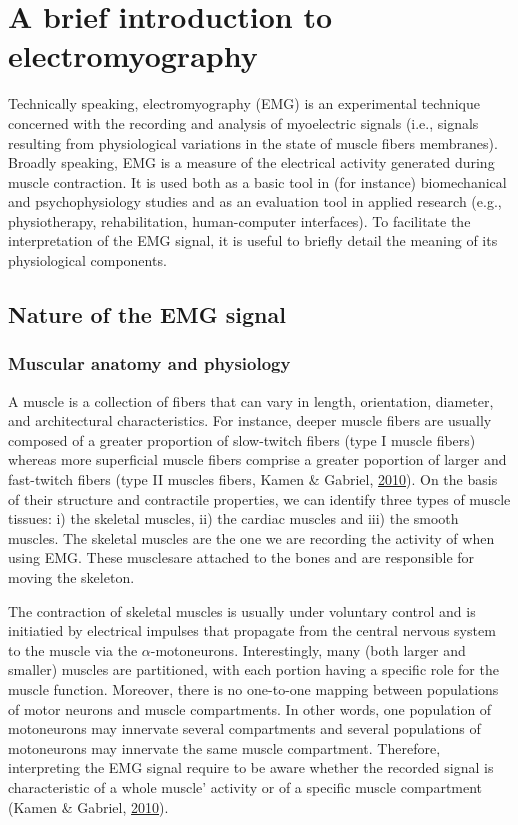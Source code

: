 \documentclass[a4paper,12pt,twoside,openright,oldfontcommands]{memoir}
\begin{document}
\section{A brief introduction to
electromyography}\label{a-brief-introduction-to-electromyography}

Technically speaking, electromyography (EMG) is an experimental
technique concerned with the recording and analysis of myoelectric
signals (i.e., signals resulting from physiological variations in the
state of muscle fibers membranes). Broadly speaking, EMG is a measure of
the electrical activity generated during muscle contraction. It is used
both as a basic tool in (for instance) biomechanical and
psychophysiology studies and as an evaluation tool in applied research
(e.g., physiotherapy, rehabilitation, human-computer interfaces). To
facilitate the interpretation of the EMG signal, it is useful to briefly
detail the meaning of its physiological components.

\subsection{Nature of the EMG signal}\label{nature-of-the-emg-signal}

\subsubsection{Muscular anatomy and
physiology}\label{muscular-anatomy-and-physiology}

A muscle is a collection of fibers that can vary in length, orientation,
diameter, and architectural characteristics. For instance, deeper muscle
fibers are usually composed of a greater proportion of slow-twitch
fibers (type I muscle fibers) whereas more superficial muscle fibers
comprise a greater poportion of larger and fast-twitch fibers (type II
muscles fibers, Kamen \& Gabriel,
\protect\hyperlink{ref-kamen_essentials_2010}{2010}). On the basis of
their structure and contractile properties, we can identify three types
of muscle tissues: i) the skeletal muscles, ii) the cardiac muscles and
iii) the smooth muscles. The skeletal muscles are the one we are
recording the activity of when using EMG. These musclesare attached to
the bones and are responsible for moving the skeleton.

The contraction of skeletal muscles is usually under voluntary control
and is initiatied by electrical impulses that propagate from the central
nervous system to the muscle via the \(\alpha\)-motoneurons.
Interestingly, many (both larger and smaller) muscles are partitioned,
with each portion having a specific role for the muscle function.
Moreover, there is no one-to-one mapping between populations of motor
neurons and muscle compartments. In other words, one population of
motoneurons may innervate several compartments and several populations
of motoneurons may innervate the same muscle compartment. Therefore,
interpreting the EMG signal require to be aware whether the recorded
signal is characteristic of a whole muscle' activity or of a specific
muscle compartment (Kamen \& Gabriel,
\protect\hyperlink{ref-kamen_essentials_2010}{2010}).
\end{document}
